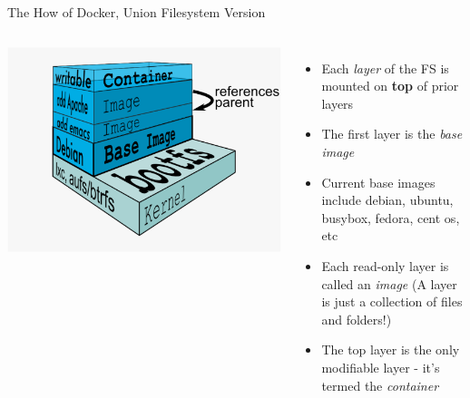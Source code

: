 \documentclass[xcolor=dvipsnames]{beamer}
\newcommand{\cpause}{}
\begin{document}
\begin{frame}{The How of Docker, Union Filesystem Version}

\begin{columns}
  \includegraphics[width=\textwidth]{figures/union-fs.pdf}
  \begin{itemize}
  \item Each \textit{layer} of the FS is mounted on \textbf{top} of prior layers \cpause
  \item The first layer is the \textit{base image} \cpause
  \item Current base images include debian, ubuntu, busybox, fedora, cent os, etc \cpause
  \item Each read-only layer is called an \textit{image} (A layer is just a collection of files and folders!) \cpause
  \item The top layer is the only modifiable layer - it's termed the \textit{container} \cpause
  \end{itemize}
\end{columns} 

\end{frame}
\end{document}

